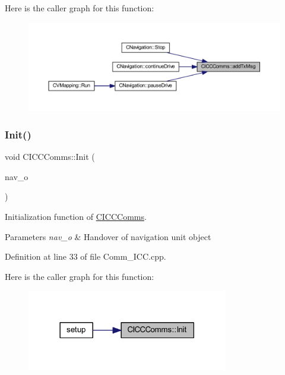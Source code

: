 Here is the caller graph for this function\+:
\nopagebreak
\begin{figure}[H]
\begin{center}
\leavevmode
\includegraphics[width=350pt]{class_c_i_c_c_comms_ab925dd7ff82f30ccd9f770ab2281b3ab_icgraph}
\end{center}
\end{figure}
\mbox{\label{class_c_i_c_c_comms_ad1d35d2145363d2ab970f9f5cd1dfc23}} 
\subsubsection{\texorpdfstring{Init()}{Init()}}
{\footnotesize\ttfamily void C\+I\+C\+C\+Comms\+::\+Init (\begin{DoxyParamCaption}\item[{\mbox{\hyperlink{class_c_navigation}{C\+Navigation}} $\ast$}]{nav\+\_\+o }\end{DoxyParamCaption})\hspace{0.3cm}{\ttfamily [virtual]}}



Initialization function of \mbox{\hyperlink{class_c_i_c_c_comms}{C\+I\+C\+C\+Comms}}. 


\begin{DoxyParams}{Parameters}
{\em nav\+\_\+o} & Handover of navigation unit object \\
\hline
\end{DoxyParams}


Definition at line 33 of file Comm\+\_\+\+I\+C\+C.\+cpp.

Here is the caller graph for this function\+:
\nopagebreak
\begin{figure}[H]
\begin{center}
\leavevmode
\includegraphics[width=249pt]{class_c_i_c_c_comms_ad1d35d2145363d2ab970f9f5cd1dfc23_icgraph}
\end{center}
\end{figure}
\mbox{\label{class_c_i_c_c_comms_a8b3fa81307b3b9ba0e72b4aee8279c56}} 
